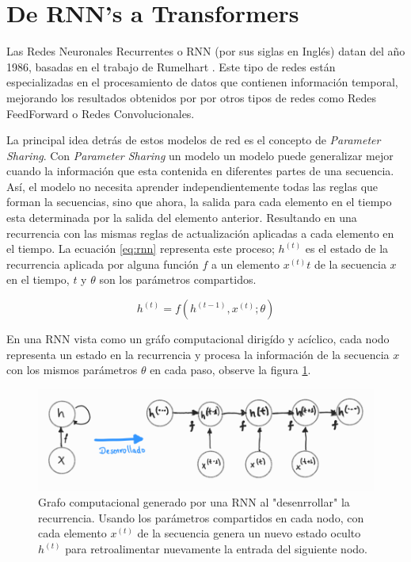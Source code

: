 \section{De RNN's a Transformers}

Las Redes Neuronales Recurrentes o RNN (por sus siglas en Inglés) datan del año 1986, basadas en el
trabajo de Rumelhart \cite{Rumelhart}. Este tipo de redes están especializadas en el procesamiento
de datos que contienen información temporal, mejorando los resultados obtenidos por por otros tipos
de redes como Redes FeedForward o Redes Convolucionales.

La principal idea detrás de estos modelos de red es el concepto de \textit{Parameter Sharing}.
Con \textit{Parameter Sharing} un modelo un modelo puede generalizar mejor cuando la información
que esta contenida en diferentes partes de una secuencia. Así, el modelo no necesita aprender
independientemente todas las reglas que forman la secuencias, sino que ahora, la salida para cada
elemento en el tiempo esta determinada por la salida del elemento anterior. Resultando en una
recurrencia con las mismas reglas de actualización aplicadas a cada elemento en el tiempo.
La ecuación \ref{eq:rnn} representa este proceso; $h^{(t)}$ es el estado de la recurrencia aplicada
por alguna función $f$ a un elemento $x^{(t)}t$ de la secuencia $x$ en el tiempo, $t$ y $\theta$ son
los parámetros compartidos.

\begin{equation}
    h^{(t)} = f(h^{(t-1)}, x^{(t)}; \theta)
\end{equation}
\label{eq:rnn}

En una RNN vista como un gráfo computacional dirigído y acíclico, cada nodo representa un estado en
la recurrencia y procesa la información de la secuencia $x$ con los mismos parámetros $\theta$ en cada
paso, observe la figura \ref{fig:rnn_cg}.

\begin{figure}[h!]
\centering
\includegraphics[width=.8\textwidth]{Chapters/1. Transformer/Figures/rnn/rnn_cgraph.png}
\caption[RNN - Grafo Computacional]{Grafo computacional generado por una RNN al "desenrrollar" la
recurrencia. Usando los parámetros compartidos en cada nodo, con cada elemento $x^{(t)}$ de la
secuencia genera un nuevo estado oculto $h^{(t)}$ para retroalimentar nuevamente la entrada del
siguiente nodo.}
\label{fig:rnn_cg}
\end{figure}

